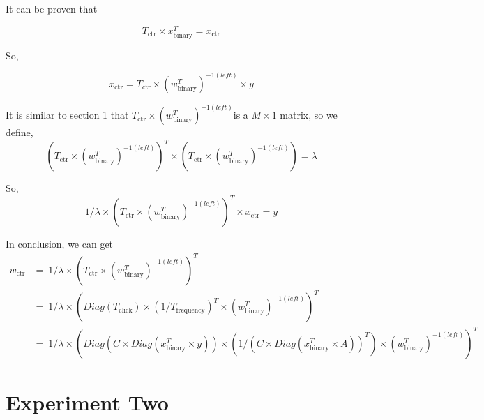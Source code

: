 \documentclass{article}
\begin{document}
It can be proven that 

\begin{equation}
T_{\text{ctr}} \times x_{\text{binary}}^T =  x_{\text{ctr}}
\end{equation}

So,

\begin{equation}
 x_{\text{ctr}} =  T_{\text{ctr}} \times (w_{\text{binary}}^T)^{-1(left)} \times y 
\end{equation}

It is similar to section 1 that \(T_{\text{ctr}} \times (w_{\text{binary}}^T)^{-1(left)}\)is a \(M \times 1\) matrix, so we define, 
\begin{equation}
(T_{\text{ctr}} \times (w_{\text{binary}}^T)^{-1(left)})^T \times (T_{\text{ctr}} \times (w_{\text{binary}}^T)^{-1(left)}) = \lambda
\end{equation}

So, 
\begin{equation}
1/{\lambda} \times (T_{\text{ctr}} \times (w_{\text{binary}}^T)^{-1(left)})^T \times x_{\text{ctr}} =  y
\end{equation}

In conclusion, we can get
\begin{equation} 
\begin{split}
w_{\text{ctr}} & =\ 1/{\lambda} \times (T_{\text{ctr}} \times (w_{\text{binary}}^T)^{-1(left)})^T \\
& = \ 1/{\lambda} \times (Diag(T_{\text{click}}) \times (1/T_{\text{frequency}} )^T \times (w_{\text{binary}}^T)^{-1(left)})^T \\
& = \ 1/{\lambda} \times (Diag(C \times Diag(x_{\text{binary}}^T \times y)) \times (1/ (C \times Diag(x_{\text{binary}}^T \times A) )^T) \times (w_{\text{binary}}^T)^{-1(left)})^T
\end{split}
\end{equation}

\section{Experiment Two}
\end{document}
